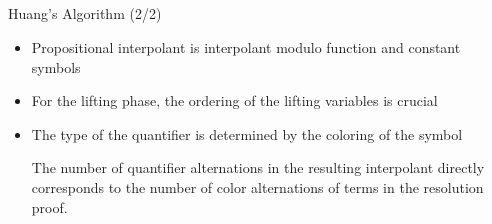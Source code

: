 \documentclass[final,compress]{beamer}
\newcommand{\gray}[1]{{\color{InfosysDarkGrey}#1}}
\begin{document}

\subsection{}
\begin{frame}{Huang's Algorithm (2/2)}
	\begin{itemize}
		\item Propositional interpolant is interpolant modulo function and constant symbols
		\item For the lifting phase, the ordering of the lifting variables is crucial
		\item The type of the quantifier is determined by the coloring of the symbol

			\pause

			\begin{theorem}
				The number of quantifier alternations in the resulting interpolant directly corresponds to the number of color alternations of terms in the resolution proof.
			\end{theorem}
	\end{itemize}
\end{frame}
\end{document}
